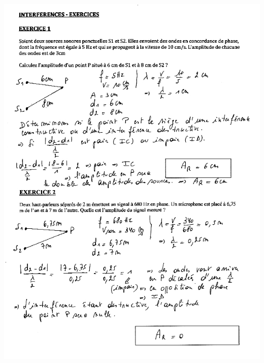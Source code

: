 {\includegraphics[width=18.253cm,height=25.273cm]{Pictures/100000010000027000000360A2E9B52B5C1C825B.png}

}
